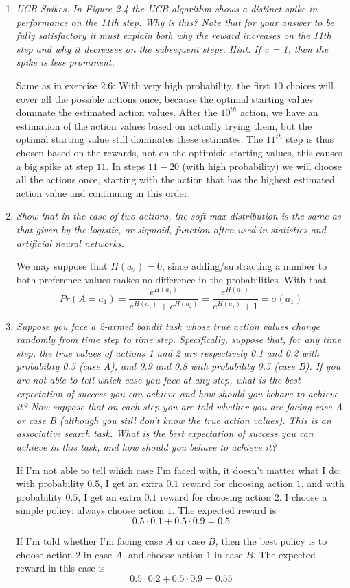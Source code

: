 \documentclass[12pt,a4paper]{article}
\begin{document}
\begin{enumerate}
\item
  \textit{UCB Spikes. In Figure 2.4 the UCB algorithm shows a distinct spike
  in performance on the 11th step. Why is this? Note that for your answer to be fully
  satisfactory it must explain both why the reward increases on the 11th step and why it
  decreases on the subsequent steps. Hint: If c = 1, then the spike is less prominent.}

  Same as in exercise $2.6$: With very high probability, the first $10$ choices will cover all the possible actions
  once, because the optimal starting values dominate the estimated action values.
  After the $10^{th}$ action, we have an estimation of the action values based
  on actually trying them, but the optimal starting value still dominates these estimates.
  The $11^{th}$ step is thus chosen based on the rewards, not on the optimisic starting values,
  this causes a big spike at step $11$. In steps $11-20$ (with high probability) we will
  choose all the actions once, starting with the action that has the highest estimated
  action value and continuing in this order.

\item
  \textit{Show that in the case of two actions, the soft-max distribution is the same
  as that given by the logistic, or sigmoid, function often used in statistics and artificial
  neural networks.}

  We may suppose that $H(a_2) = 0$, since adding/subtracting a number to both preference
  values makes no difference in the probabilities. With that
  \[
  Pr(A = a_1) = \frac{e^{H(a_1)}}{e^{H(a_1)} + e^{H(a_2)}} = \frac{e^{H(a_1)}}{e^{H(a_1)} + 1} = \sigma(a_1)
  \]

\item
  \textit{Suppose you face a 2-armed bandit task whose true action values change
  randomly from time step to time step. Specifically, suppose that, for any time step, the
  true values of actions 1 and 2 are respectively 0.1 and 0.2 with probability 0.5 (case A),
  and 0.9 and 0.8 with probability 0.5 (case B). If you are not able to tell which case you
  face at any step, what is the best expectation of success you can achieve and how should
  you behave to achieve it? Now suppose that on each step you are told whether you are
  facing case A or case B (although you still don’t know the true action values). This is an
  associative search task. What is the best expectation of success you can achieve in this
  task, and how should you behave to achieve it?}

  If I'm not able to tell which case I'm faced with, it doesn't matter what I do:
  with probability $0.5$, I get an extra $0.1$ reward for choosing action $1$,
  and with probability $0.5$, I get an extra $0.1$ reward for choosing action $2$.
  I choose a simple policy: always choose action $1$. The expected reward is
  \[
  0.5 \cdot 0.1 + 0.5 \cdot 0.9 = 0.5
  \]

  If I'm told whether I'm facing case $A$ or case $B$, then the best policy is to choose
  action $2$ in case $A$, and choose action $1$ in case $B$. The expected reward in this
  case is
  \[0.5 \cdot 0.2 + 0.5 \cdot 0.9 = 0.55\]
\end{enumerate}
\end{document}

